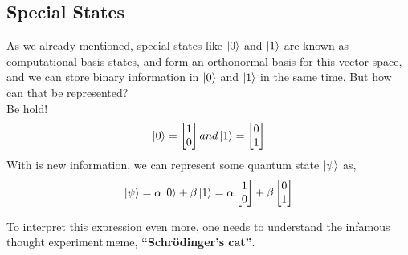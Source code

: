 \documentclass{article}
\begin{document}
\subsection{Special States}
\label{subsec: Special States}
As we already mentioned, special states like $\ket{0}$ and $\ket{1}$ are known as
computational basis states, and form an orthonormal basis for this vector space, and we can store binary information in $\ket{0}$ and $\ket{1}$ in the same time. But how can that be represented?\\
Be hold!
\begin{equation}
    \ket{0} = \begin{bmatrix}
        1 \\ 0
    \end{bmatrix} and
    \ket{1} = \begin{bmatrix}
        0 \\1 
    \end{bmatrix}
\end{equation}
With is new information, we can represent some quantum state $\ket{\psi}$ as,
\begin{equation}
    \ket{\psi} = \alpha\ket{0}+\beta\ket{1} = \alpha\begin{bmatrix}
        1\\0
    \end{bmatrix}+\beta\begin{bmatrix}
        0\\1
    \end{bmatrix}
\end{equation}

To interpret this expression even more, one needs to understand the infamous thought experiment$\ $meme, \textbf{“Schrödinger's cat”}.
\end{document}
